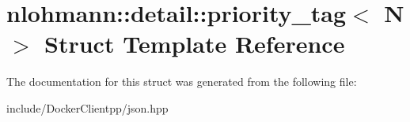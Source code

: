 \hypertarget{structnlohmann_1_1detail_1_1priority__tag}{}\section{nlohmann\+::detail\+::priority\+\_\+tag$<$ N $>$ Struct Template Reference}
\label{structnlohmann_1_1detail_1_1priority__tag}


The documentation for this struct was generated from the following file\+:\begin{DoxyCompactItemize}
\item 
include/\+Docker\+Clientpp/json.\+hpp\end{DoxyCompactItemize}
